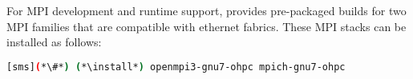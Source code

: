 For MPI development and runtime support, \OHPC{} provides pre-packaged builds
for two MPI families that are compatible with ethernet fabrics. These MPI
stacks can be installed as follows:

\begin{lstlisting}[language=bash]
[sms](*\#*) (*\install*) openmpi3-gnu7-ohpc mpich-gnu7-ohpc
\end{lstlisting}




